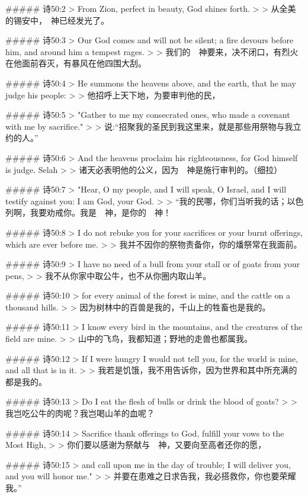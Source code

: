 ##### 诗50:2
> From Zion, perfect in beauty, God shines forth.
>
> 从全美的锡安中，　神已经发光了。


##### 诗50:3
> Our God comes and will not be silent; a fire devours before him, and around him a tempest rages.
>
> 我们的　神要来，决不闭口，有烈火在他面前吞灭，有暴风在他四围大刮。


##### 诗50:4
> He summons the heavens above, and the earth, that he may judge his people:
>
> 他招呼上天下地，为要审判他的民，


##### 诗50:5
> "Gather to me my consecrated ones, who made a covenant with me by sacrifice."
>
> 说:“招聚我的圣民到我这里来，就是那些用祭物与我立约的人。”


##### 诗50:6
> And the heavens proclaim his righteousness, for God himself is judge. Selah
>
> 诸天必表明他的公义，因为　神是施行审判的。（细拉）


##### 诗50:7
> "Hear, O my people, and I will speak, O Israel, and I will testify against you: I am God, your God.
>
> “我的民哪，你们当听我的话；以色列啊，我要劝戒你。我是　神，是你的　神！


##### 诗50:8
> I do not rebuke you for your sacrifices or your burnt offerings, which are ever before me.
>
> 我并不因你的祭物责备你，你的燔祭常在我面前。


##### 诗50:9
> I have no need of a bull from your stall or of goats from your pens,
>
> 我不从你家中取公牛，也不从你圈内取山羊。


##### 诗50:10
> for every animal of the forest is mine, and the cattle on a thousand hills.
>
> 因为树林中的百兽是我的，千山上的牲畜也是我的。


##### 诗50:11
> I know every bird in the mountains, and the creatures of the field are mine.
>
> 山中的飞鸟，我都知道；野地的走兽也都属我。


##### 诗50:12
> If I were hungry I would not tell you, for the world is mine, and all that is in it.
>
> 我若是饥饿，我不用告诉你，因为世界和其中所充满的都是我的。


##### 诗50:13
> Do I eat the flesh of bulls or drink the blood of goats?
>
> 我岂吃公牛的肉呢？我岂喝山羊的血呢？


##### 诗50:14
> Sacrifice thank offerings to God, fulfill your vows to the Most High,
>
> 你们要以感谢为祭献与　神，又要向至高者还你的愿，


##### 诗50:15
> and call upon me in the day of trouble; I will deliver you, and you will honor me."
>
> 并要在患难之日求告我，我必搭救你，你也要荣耀我。”


